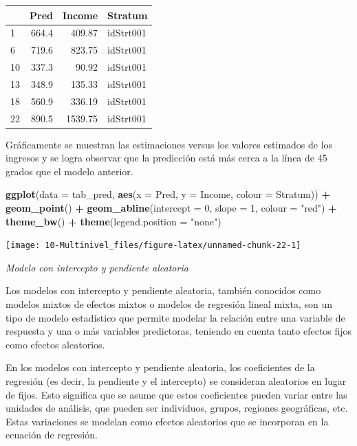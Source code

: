 \documentclass[
  spanish,
  12pt,
]{book}
\newenvironment{Shaded}{\begin{snugshade}}{\end{snugshade}}
\newcommand{\AttributeTok}[1]{\textcolor[rgb]{0.13,0.29,0.53}{#1}}
\newcommand{\DecValTok}[1]{\textcolor[rgb]{0.00,0.00,0.81}{#1}}
\newcommand{\FunctionTok}[1]{\textcolor[rgb]{0.13,0.29,0.53}{\textbf{#1}}}
\newcommand{\NormalTok}[1]{#1}
\newcommand{\SpecialCharTok}[1]{\textcolor[rgb]{0.81,0.36,0.00}{\textbf{#1}}}
\newcommand{\StringTok}[1]{\textcolor[rgb]{0.31,0.60,0.02}{#1}}
\begin{document}
\begin{tabular}{l|r|r|l}
\hline
  & Pred & Income & Stratum\\
\hline
1 & 664.4 & 409.87 & idStrt001\\
\hline
6 & 719.6 & 823.75 & idStrt001\\
\hline
10 & 337.3 & 90.92 & idStrt001\\
\hline
13 & 348.9 & 135.33 & idStrt001\\
\hline
18 & 560.9 & 336.19 & idStrt001\\
\hline
22 & 890.5 & 1539.75 & idStrt001\\
\hline
\end{tabular}

Gráficamente se muestran las estimaciones versus los valores estimados de los ingresos y se logra observar que la predicción está más cerca a la línea de 45 grados que el modelo anterior.

\begin{Shaded}
\begin{Highlighting}[]
\FunctionTok{ggplot}\NormalTok{(}\AttributeTok{data =}\NormalTok{ tab\_pred, }\FunctionTok{aes}\NormalTok{(}\AttributeTok{x =}\NormalTok{ Pred, }\AttributeTok{y =}\NormalTok{ Income, }\AttributeTok{colour =}\NormalTok{ Stratum)) }\SpecialCharTok{+} 
  \FunctionTok{geom\_point}\NormalTok{() }\SpecialCharTok{+} \FunctionTok{geom\_abline}\NormalTok{(}\AttributeTok{intercept =} \DecValTok{0}\NormalTok{, }\AttributeTok{slope =} \DecValTok{1}\NormalTok{, }\AttributeTok{colour =} \StringTok{"red"}\NormalTok{) }\SpecialCharTok{+}
  \FunctionTok{theme\_bw}\NormalTok{() }\SpecialCharTok{+} \FunctionTok{theme}\NormalTok{(}\AttributeTok{legend.position =} \StringTok{"none"}\NormalTok{) }
\end{Highlighting}
\end{Shaded}

\texttt{[image: 10-Multinivel\_files/figure-latex/unnamed-chunk-22-1]}

\emph{Modelo con intercepto y pendiente aleatoria}

Los modelos con intercepto y pendiente aleatoria, también conocidos como modelos mixtos de efectos mixtos o modelos de regresión lineal mixta, son un tipo de modelo estadístico que permite modelar la relación entre una variable de respuesta y una o más variables predictoras, teniendo en cuenta tanto efectos fijos como efectos aleatorios.

En los modelos con intercepto y pendiente aleatoria, los coeficientes de la regresión (es decir, la pendiente y el intercepto) se consideran aleatorios en lugar de fijos. Esto significa que se asume que estos coeficientes pueden variar entre las unidades de análisis, que pueden ser individuos, grupos, regiones geográficas, etc. Estas variaciones se modelan como efectos aleatorios que se incorporan en la ecuación de regresión.
\end{document}
